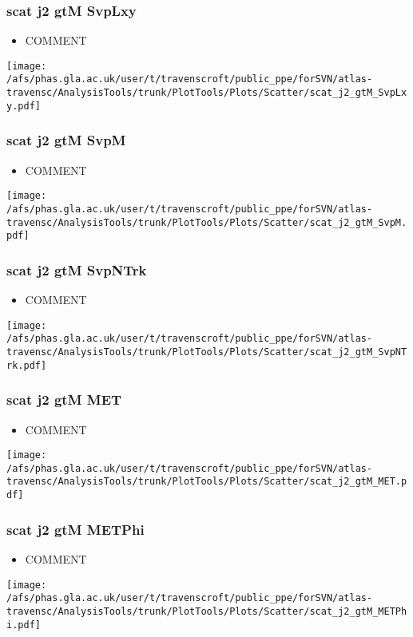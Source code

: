 \documentclass{beamer}
\begin{document}
\begin{frame}
\frametitle{scat j2 gtM SvpLxy}
\begin{itemize}
\item COMMENT
\end{itemize}
\begin{center}
\texttt{[image: /afs/phas.gla.ac.uk/user/t/travenscroft/public\_ppe/forSVN/atlas-travensc/AnalysisTools/trunk/PlotTools/Plots/Scatter/scat\_j2\_gtM\_SvpLxy.pdf]}
\end{center}
\end{frame}

\begin{frame}
\frametitle{scat j2 gtM SvpM}
\begin{itemize}
\item COMMENT
\end{itemize}
\begin{center}
\texttt{[image: /afs/phas.gla.ac.uk/user/t/travenscroft/public\_ppe/forSVN/atlas-travensc/AnalysisTools/trunk/PlotTools/Plots/Scatter/scat\_j2\_gtM\_SvpM.pdf]}
\end{center}
\end{frame}

\begin{frame}
\frametitle{scat j2 gtM SvpNTrk}
\begin{itemize}
\item COMMENT
\end{itemize}
\begin{center}
\texttt{[image: /afs/phas.gla.ac.uk/user/t/travenscroft/public\_ppe/forSVN/atlas-travensc/AnalysisTools/trunk/PlotTools/Plots/Scatter/scat\_j2\_gtM\_SvpNTrk.pdf]}
\end{center}
\end{frame}

\begin{frame}
\frametitle{scat j2 gtM MET}
\begin{itemize}
\item COMMENT
\end{itemize}
\begin{center}
\texttt{[image: /afs/phas.gla.ac.uk/user/t/travenscroft/public\_ppe/forSVN/atlas-travensc/AnalysisTools/trunk/PlotTools/Plots/Scatter/scat\_j2\_gtM\_MET.pdf]}
\end{center}
\end{frame}

\begin{frame}
\frametitle{scat j2 gtM METPhi}
\begin{itemize}
\item COMMENT
\end{itemize}
\begin{center}
\texttt{[image: /afs/phas.gla.ac.uk/user/t/travenscroft/public\_ppe/forSVN/atlas-travensc/AnalysisTools/trunk/PlotTools/Plots/Scatter/scat\_j2\_gtM\_METPhi.pdf]}
\end{center}
\end{frame}
\end{document}
